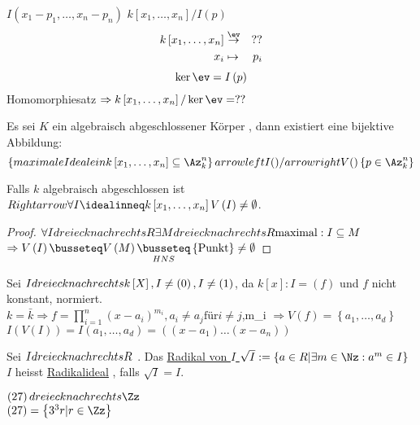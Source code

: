 \begin{bem}
\begin{bsp}
\begin{prop}
\begin{itemize}
\begin{bsp}
\begin{bem}
\( I \left( x_1-p_1, \dots , x_n-p_n \right) \)
\(k \left[x_1, \dots ,x_n \right] / I \left(p \right) \)
\begin{eqnarray}
k \left[x_1, \dots , x_n \right] & \overset{\ev}{\to} & ?? \\
x_i & \mapsto & p_i 
\end{eqnarray}
\[ \ker \ev = I \left( p \right) \] 
 Homomorphiesatz \( \Rightarrow  k \left[x_1, \dots,x_n \right] / \ker \ev = ?? \) 
 \begin{satz}
 Es sei \( K \) ein algebraisch abgeschlossener K\"orper , dann existiert eine bijektive Abbildung:
 \[ \left\lbrace maximale Ideale in k \left[x_1, \dots, x_n \right] \subseteq \Az_k^n \right\rbrace arrow left I () / arrow right V() \left\lbrace p \in \Az_k^n \right\rbrace \]
\end{satz}
\begin{kor}
Falls \( k \) algebraisch abgeschlossen ist \( Rightarrow  \forall I \idealinneq k \left[ x_1, \dots,x_n \right] V \left( I \right) \neq \emptyset \).
\end{kor}
\begin{proof}
\( \forall I dreieck nach rechts R \exists M dreieck nach rechts R \text{maximal} : I \subseteq M \)
\( \Rightarrow V \left( I \right) \busseteq V \left( M \right) \underset{HNS}{\busseteq} \left\lbrace \text{Punkt} \right\rbrace \neq \emptyset \)
\end{proof}
\begin{bsp}
Sei \( I dreieck nach rechts k \left[ X \right] , I \neq \left( 0 \right) , I \neq \left(1 \right) \), da \( k \left[x \right] : I = \left( f \right) \) und \(f\) nicht konstant, normiert.\\
\( k = \bar{k} \Rightarrow f= \prod_{i=1}^n \left( x-a_i \right)^{m_i} ,a_i \neq a_j \text{f\"ur} i \neq j \),m_i  \)
\( \Rightarrow V \left( f \right) = \left\lbrace a_1, \dots ,a_d \right\rbrace \)
\(I \left( V \left( I \right) \right) = I \left( a_1, \dots, a_d \right)  = \left( \left( x-a_1 \right) \dots \left(x-a_n \right) \right) \)
\begin{defn}
Sei \( I dreieck nach rechts R \) . Das \underline{Radikal von \( I \) } \( \sqrt{I }:= \left\lbrace a \in R \vert \exists m \in \Nz: a^m \in I \right\rbrace \)
\( I \) heisst \underline{Radikalideal} , falls \( \sqrt{I } = I \).
\end{defn}
\begin{bsp}
\( \left( 27 \right) \idealin \Zz \) \\
\( \left( 27 \right) = \left\lbrace 3^3 r \vert r \in \Zz \right\rbrace \) \\


\end{bsp}
\end{bsp}
\end{bem}
\end{bsp}
\end{itemize}
\end{prop}
\end{bsp}
\end{bem}
